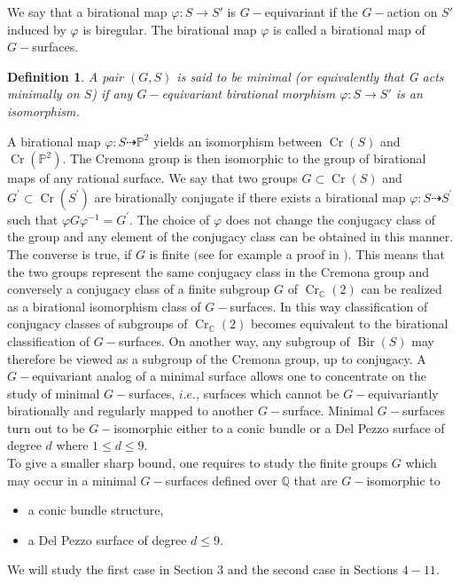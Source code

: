 \documentclass[leqno,12pt]{amsart} %
\newtheorem{defi}[thm]{Definition}
\newcommand{\rat}{\dashrightarrow}
\newcommand{\Q}{\ensuremath{\mathbb{Q} }}
\newcommand{\C}{\ensuremath{\mathbb{C} }}
\newcommand{\p}{\ensuremath{\mathbb{P} }}
\DeclareMathOperator{\Bir}{Bir}
\DeclareMathOperator{\Cr}{Cr}
\begin{document}
We say that a birational map $\varphi:S\rightarrow S'$ is $G-$equivariant if the $G-$action on $S'$ induced by $\varphi$ is biregular. The birational map $\varphi$ is called a birational map of $G-$surfaces.
  \begin{defi}
      A pair $(G, S)$ is said to be minimal (or equivalently that G acts minimally on $S$) if
any $G-$equivariant birational morphism $\varphi:S\rightarrow S'$ is an isomorphism.
  \end{defi}
A birational map $\varphi:S\rat\p^2$ yields an isomorphism between $\Cr(S)$ and $\Cr(\p^2)$. The Cremona group is then isomorphic to the group of birational maps of any rational surface. We say that two groups $G\subset\Cr(S)$ and $G^{\prime}\subset\Cr(S^{\prime})$ are birationally conjugate if there exists a birational map $\varphi:S\rat S^{\prime}$ such that $\varphi G\varphi^{-1}=G^{\prime}$. The choice of $\varphi$ does not change the conjugacy class of the group and any element of the conjugacy class can be obtained in this manner. The converse is true, if $G$ is finite $($see for example a proof in \cite[Theorem $1.4$]{MR1954063}$)$. This means that the two groups represent the same conjugacy class in the Cremona group and conversely a conjugacy class of a finite subgroup $G$ of $\Cr_\C(2)$ can be realized as a birational isomorphism class of $G-$surfaces. In this way classification of conjugacy classes of subgroups of $\Cr_\C(2)$ becomes equivalent to the birational classification of $G-$surfaces. On another way, any subgroup of $\Bir(S)$ may therefore be viewed as a subgroup of the Cremona group, up to conjugacy. A $G-$equivariant analog of a minimal surface allows one to concentrate on the study of minimal $G-$surfaces, $i.e.$, surfaces which cannot be $G-$equivariantly birationally and regularly mapped to another $G-$surface. Minimal $G-$surfaces turn out to be $G-$isomorphic either to a conic bundle or a Del Pezzo surface of degree $d$ where $1\le  d \le  9$. \\
To give a smaller sharp bound, one requires to study the finite groups $G$ which may occur in a minimal $G-$surfaces defined over $\Q$ that are $G-$isomorphic to
\begin{itemize}
      \item  a conic bundle structure,
        \item a Del Pezzo surface of degree $d \le  9$.
\end{itemize}
We will study the first case in Section $3$ and the second case in Sections $4-11$.
\end{document}
